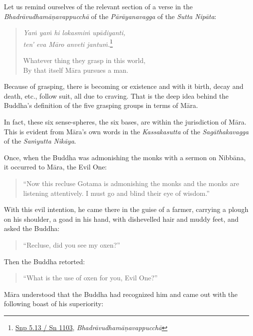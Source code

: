 Let us remind ourselves of the relevant section of a verse in the \emph{Bhadrāvudhamāṇavappucchā} of the \emph{Pārāyanavagga} of the \emph{Sutta Nipāta}:

\begin{quote}
\emph{Yaṁ yaṁ hi lokasmiṁ upādiyanti,}\\
\emph{ten' eva Māro anveti jantuṁ.}\footnote{\href{https://suttacentral.net/snp5.13/pli/ms}{Snp 5.13 / Sn 1103}, \emph{Bhadrāvudhamāṇavappucchā}}

Whatever thing they grasp in this world,\\
By that itself Māra pursues a man.
\end{quote}

Because of grasping, there is becoming or existence and with it birth, decay and death, etc., follow suit, all due to craving. That is the deep idea behind the Buddha's definition of the five grasping groups in terms of Māra.

In fact, these six sense-spheres, the six bases, are within the jurisdiction of Māra. This is evident from Māra's own words in the \emph{Kassakasutta} of the \emph{Sagāthakavagga} of the \emph{Saṁyutta Nikāya}.

Once, when the Buddha was admonishing the monks with a sermon on Nibbāna, it occurred to Māra, the Evil One:

\begin{quote}
``Now this recluse Gotama is admonishing the monks and the monks are listening attentively. I must go and blind their eye of wisdom.''
\end{quote}

With this evil intention, he came there in the guise of a farmer, carrying a plough on his shoulder, a goad in his hand, with dishevelled hair and muddy feet, and asked the Buddha:

\begin{quote}
``Recluse, did you see my oxen?''
\end{quote}

Then the Buddha retorted:

\begin{quote}
``What is the use of oxen for you, Evil One?''
\end{quote}

Māra understood that the Buddha had recognized him and came out with the following boast of his superiority:

